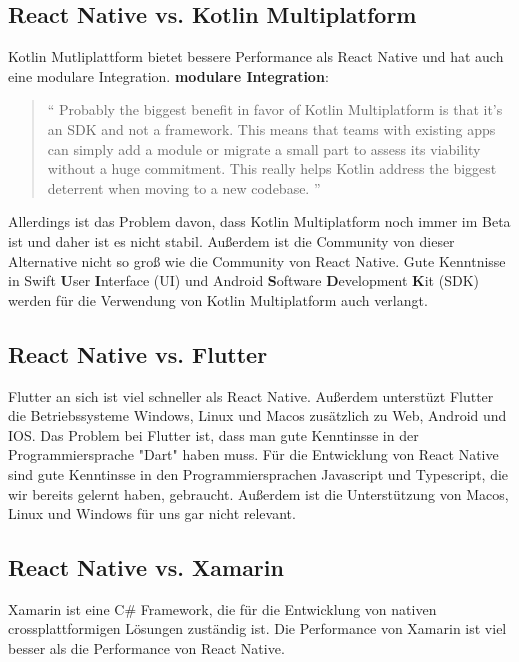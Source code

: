 \begin{spacing}{1}
    \subsection{React Native vs. Kotlin Multiplatform}
    Kotlin Mutliplattform bietet bessere Performance als React Native und hat auch eine modulare Integration.
    \newline
    \textbf{modulare Integration}: \begin{quotation}
        ``
        Probably the biggest benefit in favor of Kotlin Multiplatform is that it’s
        an SDK and not a framework. This means that teams with existing apps can
        simply add a module or migrate a small part to assess its viability without
        a huge commitment. This really helps Kotlin address the biggest deterrent
        when moving to a new codebase.
        ''
        \cite{kotlin-multiplatform-vs-react-native}
    \end{quotation}
    Allerdings ist das Problem davon, dass Kotlin Multiplatform noch immer im Beta ist und daher ist es nicht stabil.
    Außerdem  ist die Community von dieser Alternative nicht so groß wie die Community von React Native.
    Gute Kenntnisse in Swift \textbf{U}ser \textbf{I}nterface (UI) und Android \textbf{S}oftware \textbf{D}evelopment \textbf{K}it (SDK) werden für die Verwendung von Kotlin Multiplatform auch verlangt.
    \cite{kotlin-multiplatform-vs-react-native}
    \subsection{React Native vs. Flutter}

    Flutter an sich ist viel schneller als React Native.
    Außerdem unterstüzt Flutter die Betriebssysteme  Windows, Linux und Macos zusätzlich zu Web, Android und IOS.
    \cite{flutter-vs-react-native}
    \newline
    Das Problem bei Flutter ist, dass man gute Kenntinsse in der Programmiersprache "Dart" haben muss. \cite{flutter-vs-react-native}
    Für die Entwicklung von React Native sind gute Kenntinsse in den Programmiersprachen Javascript und Typescript,
    die wir bereits gelernt haben,
    gebraucht.
    Außerdem ist die Unterstützung von Macos, Linux und Windows für uns gar nicht relevant.




    \subsection{React Native vs. Xamarin}
    Xamarin ist eine C\# Framework, die für die Entwicklung von nativen crossplattformigen Lösungen zuständig ist.
    Die Performance von Xamarin ist viel besser als die Performance von React Native. \cite{xamarin-vs-react-native}


\end{spacing}

